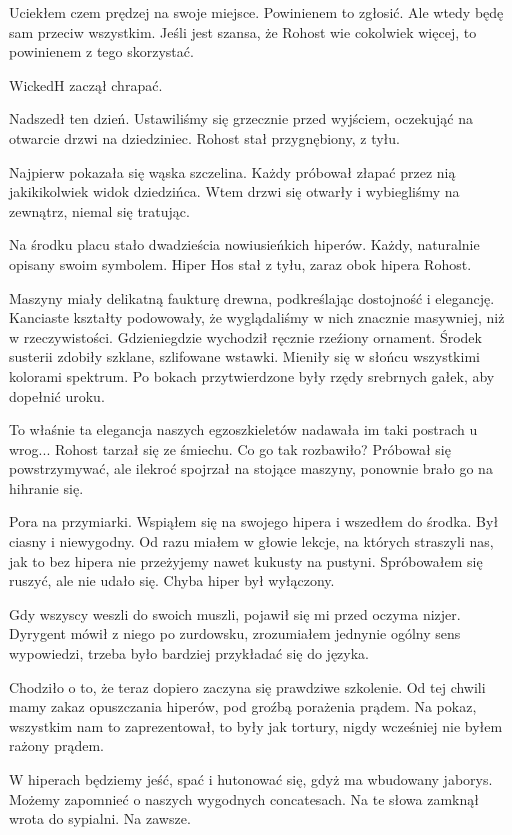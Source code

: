Uciekłem czem prędzej na swoje miejsce.
Powinienem to zgłosić.
Ale wtedy będę sam przeciw wszystkim.
Jeśli jest szansa, że Rohost wie cokolwiek więcej, to powinienem z tego skorzystać.

\divider{}

WickedH zaczął chrapać.

\divider{}

Nadszedł ten dzień.
Ustawiliśmy się grzecznie przed wyjściem, oczekująć na otwarcie drzwi na dziedziniec.
Rohost stał przygnębiony, z tyłu.

Najpierw pokazała się wąska szczelina.
Każdy próbował złapać przez nią jakikikolwiek widok dziedzińca.
Wtem drzwi się otwarły i wybiegliśmy na zewnątrz, niemal się tratując.

Na środku placu stało dwadzieścia nowiusieńkich hiperów.
Każdy, naturalnie opisany swoim symbolem.
Hiper Hos stał z tyłu, zaraz obok hipera Rohost.

Maszyny miały delikatną faukturę drewna, podkreślając dostojność i elegancję.
Kanciaste kształty podowowały, że wyglądaliśmy w nich znacznie masywniej, niż w rzeczywistości.
Gdzieniegdzie wychodził ręcznie rzeźiony ornament.
Środek susterii zdobiły szklane, szlifowane wstawki. Mieniły się w słońcu wszystkimi kolorami spektrum.
Po bokach przytwierdzone były rzędy srebrnych gałek, aby dopełnić uroku.

To właśnie ta elegancja naszych egzoszkieletów nadawała im taki postrach u wrog...
Rohost tarzał się ze śmiechu. Co go tak rozbawiło?
Próbował się powstrzymywać, ale ilekroć spojrzał na stojące maszyny, ponownie brało go na hihranie się.

Pora na przymiarki.
Wspiąłem się na swojego hipera i wszedłem do środka.
Był ciasny i niewygodny.
Od razu miałem w głowie lekcje, na których straszyli nas, jak to bez hipera nie przeżyjemy nawet kukusty na pustyni.
Spróbowałem się ruszyć, ale nie udało się.
Chyba hiper był wyłączony.

Gdy wszyscy weszli do swoich muszli, pojawił się mi przed oczyma nizjer.
Dyrygent mówił z niego po zurdowsku, zrozumiałem jednynie ogólny sens wypowiedzi, trzeba było bardziej przykładać się do języka.

Chodziło o to, że teraz dopiero zaczyna się prawdziwe szkolenie.
Od tej chwili mamy zakaz opuszczania hiperów, pod groźbą porażenia prądem.
Na pokaz, wszystkim nam to zaprezentował, to były jak tortury, nigdy wcześniej nie byłem rażony prądem.

W hiperach będziemy jeść, spać i hutonować się, gdyż ma wbudowany jaborys.
Możemy zapomnieć o naszych wygodnych concatesach.
Na te słowa zamknął wrota do sypialni. Na zawsze.

